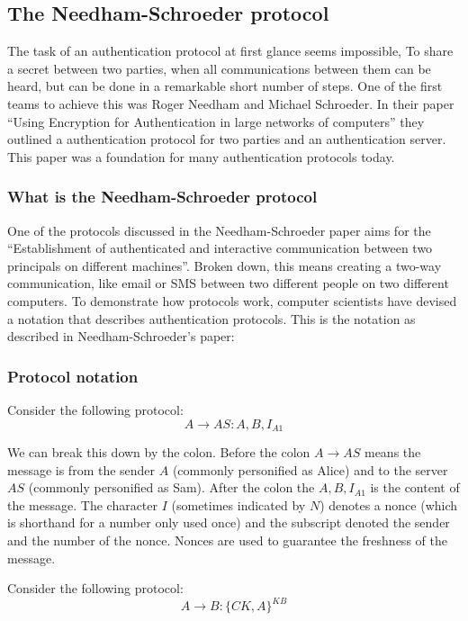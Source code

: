 \documentclass{article}
\begin{document}
\subsection{The Needham-Schroeder protocol}
The task of an authentication protocol at first glance seems impossible, To
share a secret between two parties, when all communications between them can be
heard, but can be done in a remarkable short number of steps. One of the first
teams to achieve this was Roger Needham and Michael Schroeder. In their paper
“Using Encryption for Authentication in large networks of computers” they
outlined a authentication protocol for two parties and an authentication server.
This paper was a foundation for many authentication protocols today.

\subsubsection{What is the Needham-Schroeder protocol}
One of the protocols discussed in the Needham-Schroeder paper aims for the
“Establishment of authenticated and interactive communication between two
principals on different machines”. Broken down, this means creating a two-way
communication, like email or SMS between two different people on two different
computers. To demonstrate how protocols work, computer scientists have devised a
notation that describes authentication protocols. This is the notation as
described in Needham-Schroeder’s paper:

\subsubsection{Protocol notation}
Consider the following protocol:
\begin{equation}
    A \rightarrow AS: A, B, I_{A1}
\end{equation}

We can break this down by the colon. Before the colon $A \rightarrow AS$ means
the message is from the sender $A$ (commonly personified as Alice) and to the
server $AS$ (commonly personified as Sam). After the colon the $A, B, I_{A1}$ is
the content of the message. The character $I$ (sometimes indicated by $N$)
denotes a nonce (which is shorthand for a number only used once) and the
subscript denoted the sender and the number of the nonce. Nonces are used to
guarantee the freshness of the message.



Consider the following protocol:
\begin{equation}
    A \rightarrow B: \{CK, A\}^{KB}
\end{equation}
\end{document}
